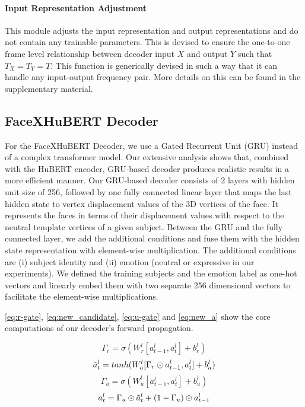 \documentclass[10pt,twocolumn,letterpaper]{article}
\begin{document}
\paragraph{Input Representation Adjustment}
This module adjusts the input representation and output representations and do not contain any trainable parameters. This is devised to ensure the one-to-one frame level relationship between decoder input $X$ and output $Y$ such that $T_X = T_Y = T$. This function is generically devised in such a way that it can handle any input-output frequency pair. More details on this can be found in the supplementary material.

\subsection{FaceXHuBERT Decoder}
For the FaceXHuBERT Decoder, we use a Gated Recurrent Unit (GRU) instead of a complex transformer model. Our extensive analysis shows that, combined with the HuBERT encoder, GRU-based decoder produces realistic results in a more efficient manner. Our GRU-based decoder consists of 2 layers with hidden unit size of 256, followed by one fully connected linear layer that maps the last hidden state to vertex displacement values of the 3D vertices of the face. It represents the faces in terms of their displacement values with respect to the neutral template vertices of a given subject. Between the GRU and the fully connected layer, we add the additional conditions and fuse them with the hidden state representation with element-wise multiplication. The additional conditions are (i) subject identity and (ii) emotion (neutral or expressive in our experiments). We defined the training subjects and the emotion label as one-hot vectors and linearly embed them with two separate 256 dimensional vectors to facilitate the element-wise multiplications. 

\cref{eq:r-gate}, \cref{eq:new_candidate}, \cref{eq:u-gate} and \cref{eq:new_a} show the core computations of our decoder's forward propagation.

\begin{equation}
  \Gamma_r = \sigma(W_r^{l} [a_{t-1}^{l}, a_t^{l}] + b_r^{l})
  \label{eq:r-gate}
\end{equation}
\vspace{-1.5em}
\begin{equation}
  \Tilde{a}_t^{l} = tanh (W_a^{l} [\Gamma_r \odot a_{t-1}^{l}, a_t^{l}] + b_a^{l})
  \label{eq:new_candidate}
\end{equation}
\vspace{-1.5em}
\begin{equation}
  \Gamma_u = \sigma(W_u^{l} [a_{t-1}^{l}, a_t^{l}] + b_u^{l})
  \label{eq:u-gate}
\end{equation}
\vspace{-1.5em}
\begin{equation}
  a_t^{l} = \Gamma_u \odot \Tilde{a}_t^{l} + (1-\Gamma_u) \odot a_{t-1}^{l}
  \label{eq:new_a}
\end{equation}
\end{document}
